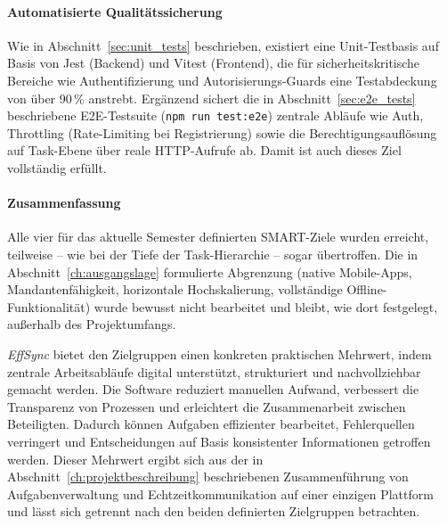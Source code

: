 \paragraph{Automatisierte Qualitätssicherung}
Wie in Abschnitt~\ref{sec:unit_tests} beschrieben, existiert eine Unit-Testbasis auf Basis von Jest (Backend) und Vitest (Frontend), die für sicherheitskritische Bereiche wie Authentifizierung und Autorisierungs-Guards eine Testabdeckung von über 90\,\% anstrebt. Ergänzend sichert die in Abschnitt~\ref{sec:e2e_tests} beschriebene E2E-Testsuite (\texttt{npm run test:e2e}) zentrale Abläufe wie Auth, Throttling (Rate-Limiting bei Registrierung) sowie die Berechtigungsauflösung auf Task-Ebene über reale HTTP-Aufrufe ab. Damit ist auch dieses Ziel vollständig erfüllt.

\paragraph{Zusammenfassung}
Alle vier für das aktuelle Semester definierten SMART-Ziele wurden erreicht, teilweise -- wie bei der Tiefe der Task-Hierarchie -- sogar übertroffen. Die in Abschnitt~\ref{ch:ausgangslage} formulierte Abgrenzung (native Mobile-Apps, Mandantenfähigkeit, horizontale Hochskalierung, vollständige Offline-Funktionalität) wurde bewusst nicht bearbeitet und bleibt, wie dort festgelegt, außerhalb des Projektumfangs.

\label{subsec:praktischer-mehrwert}

\textit{EffSync} bietet den Zielgruppen einen konkreten praktischen Mehrwert, indem zentrale Arbeitsabläufe digital unterstützt, strukturiert und nachvollziehbar gemacht werden. Die Software reduziert manuellen Aufwand, verbessert die Transparenz von Prozessen und erleichtert die Zusammenarbeit zwischen Beteiligten. Dadurch können Aufgaben effizienter bearbeitet, Fehlerquellen verringert und Entscheidungen auf Basis konsistenter Informationen getroffen werden. Dieser Mehrwert ergibt sich aus der in Abschnitt~\ref{ch:projektbeschreibung} beschriebenen Zusammenführung von Aufgabenverwaltung und Echtzeitkommunikation auf einer einzigen Plattform und lässt sich getrennt nach den beiden definierten Zielgruppen betrachten.

